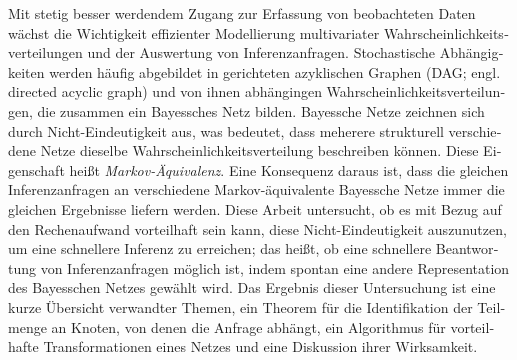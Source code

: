 {
\newpage
\null\vspace{\fill}
{}

\begin{otherlanguage}{german}

Mit stetig besser werdendem Zugang zur Erfassung von beobachteten Daten wächst die Wichtigkeit effizienter Modellierung multivariater Wahrscheinlichkeitsverteilungen und der Auswertung von Inferenzanfragen. Stochastische Abhängigkeiten werden häufig abgebildet in gerichteten azyklischen Graphen (DAG; engl. directed acyclic graph) und von ihnen abhängingen Wahrscheinlichkeitsverteilungen, die zusammen ein Bayessches Netz bilden. Bayessche Netze zeichnen sich durch Nicht-Eindeutigkeit aus, was bedeutet, dass meherere strukturell verschiedene Netze dieselbe Wahrscheinlichkeitsverteilung beschreiben können. Diese Eigenschaft heißt \textit{Markov-Äquivalenz}. Eine Konsequenz daraus ist, dass die gleichen Inferenzanfragen an verschiedene Markov-äquivalente Bayessche Netze immer die gleichen Ergebnisse liefern werden. Diese Arbeit untersucht, ob es mit Bezug auf den Rechenaufwand vorteilhaft sein kann, diese Nicht-Eindeutigkeit auszunutzen, um eine schnellere Inferenz zu erreichen; das heißt, ob eine schnellere Beantwortung von Inferenzanfragen möglich ist, indem spontan eine andere Representation des Bayesschen Netzes gewählt wird. Das Ergebnis dieser Untersuchung ist eine kurze Übersicht verwandter Themen, ein Theorem für die Identifikation der Teilmenge an Knoten, von denen die Anfrage abhängt, ein Algorithmus für vorteilhafte Transformationen eines Netzes und eine Diskussion ihrer Wirksamkeit.\newline

\end{otherlanguage}

\vspace{\fill}
\newpage
}